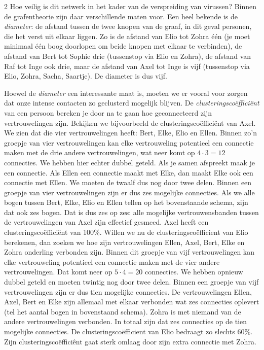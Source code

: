 \begin{multicols}{2}
Hoe veilig is dit netwerk in het kader van de verspreiding van virussen? Binnen de grafentheorie zijn daar verschillende maten voor. Een heel bekende is de \textit{diameter}: de afstand tussen de twee knopen van de graaf, in dit geval personen, die het verst uit elkaar liggen. Zo is de afstand van Elio tot Zohra één (je moet minimaal één boog doorlopen om beide knopen met elkaar te verbinden), de afstand van Bert tot Sophie drie (tussenstop via Elio en Zohra), de afstand van Raf tot Inge ook drie, maar de afstand van Axel tot Inge is vijf (tussenstop via Elio, Zohra, Sacha, Saartje). De diameter is dus vijf.

Hoewel de \textit{diameter} een interessante maat is, moeten we er vooral voor zorgen dat onze intense contacten zo geclusterd mogelijk blijven. De \textit{clusteringscoëfficiënt} van een persoon bereken je door na te gaan hoe geconnecteerd zijn vertrouwelingen zijn. Bekijken we bijvoorbeeld de clusteringscoëfficiënt van Axel. We zien dat die vier vertrouwelingen heeft: Bert, Elke, Elio en Ellen. Binnen zo’n groepje van vier vertrouwelingen kan elke vertrouweling potentieel een connectie maken met de drie andere vertrouwelingen, wat neer komt op $4\cdot 3 = 12$ connecties. We hebben hier echter dubbel geteld. Als je samen afspreekt maak je een connectie. Als Ellen een connectie maakt met Elke, dan maakt Elke ook een connectie met Ellen. We moeten de twaalf dus nog door twee delen. Binnen een groepje van vier vertrouwelingen zijn er dus zes mogelijke connecties. Als we alle bogen tussen Bert, Elke, Elio en Ellen tellen op het bovenstaande schema, zijn dat ook zes bogen. Dat is dus zes op zes: alle mogelijke vertrouwensbanden tussen de vertrouwelingen van Axel zijn effectief gesmeed. Axel heeft een clusteringscoëfficiënt van 100$\%$. Willen we nu de clusteringscoëfficient van Elio berekenen, dan zoeken we hoe zijn vertrouwelingen Ellen, Axel, Bert, Elke en Zohra onderling verbonden zijn. Binnen dit groepje van vijf vertrouwelingen kan elke vertrouweling potentieel een connectie maken met de vier andere vertrouwelingen. Dat komt  neer op $5\cdot4 = 20$ connecties. We hebben opnieuw dubbel geteld en moeten twintig nog door twee delen. Binnen een groepje van vijf vertrouwelingen zijn er dus tien mogelijke connecties. De vertrouwelingen Ellen, Axel, Bert en Elke zijn allemaal met elkaar verbonden wat zes connecties oplevert (tel het aantal bogen in bovenstaand schema). Zohra is met niemand van de andere vertrouwelingen verbonden. In totaal zijn dat zes connecties op de tien mogelijke connecties. De clusteringscoëfficient van Elio bedraagt zo slechts 60$\%$. Zijn clusteringscoëfficiênt gaat sterk omlaag door zijn extra connectie met Zohra.
\end{multicols}
